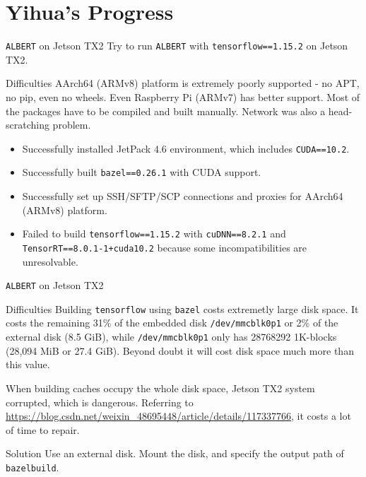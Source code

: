 \documentclass[12pt]{beamer}
\begin{document}
\section{Yihua's Progress}
\begin{frame}{\texttt{ALBERT} on Jetson TX2}
Try to run \texttt{ALBERT} with \texttt{tensorflow==1.15.2} on Jetson TX2.
\begin{block}{Difficulties}
AArch64 (ARMv8) platform is extremely poorly supported - no APT, no pip, even no wheels. Even Raspberry Pi (ARMv7) has better support. Most of the packages have to be compiled and built manually. Network was also a head-scratching problem.
\end{block}
\begin{itemize}
    \item Successfully installed JetPack 4.6 environment, which includes \texttt{CUDA==10.2}.
    \item Successfully built \texttt{bazel==0.26.1} with CUDA support.
    \item Successfully set up SSH/SFTP/SCP connections and proxies for AArch64 (ARMv8) platform.
    \item Failed to build \texttt{tensorflow==1.15.2} with \texttt{cuDNN==8.2.1} and \texttt{TensorRT==8.0.1-1+cuda10.2} because some incompatibilities are unresolvable.
\end{itemize}
\end{frame}
\begin{frame}{\texttt{ALBERT} on Jetson TX2}
\begin{block}{Difficulties}
Building \texttt{tensorflow} using \texttt{bazel} costs extremetly large disk space. It costs the remaining 31\% of the embedded disk \texttt{/dev/mmcblk0p1} or 2\% of the external disk (8.5 GiB), while \texttt{/dev/mmcblk0p1} only has 28768292 1K-blocks (28,094 MiB or 27.4 GiB). Beyond doubt it will cost disk space much more than this value.
\end{block}
When building caches occupy the whole disk space, Jetson TX2 system corrupted, which is dangerous. Referring to \url{https://blog.csdn.net/weixin_48695448/article/details/117337766}, it costs a lot of time to repair.
\begin{block}{Solution}
Use an external disk. Mount the disk, and specify the output path of \texttt{bazelbuild}.
\end{block}
\end{frame}
\end{document}
